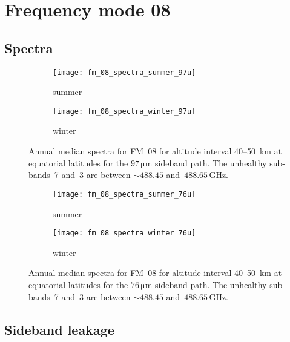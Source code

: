 \section{Frequency mode 08}
\subsection{Spectra}

\begin{figure}[ht]
    \centering
    \begin{subfigure}[b]{0.9545\textwidth}
        \texttt{[image: fm\_08\_spectra\_summer\_97u]}
        \caption{summer}\label{fig:spectra:08:summer:97u}
    \end{subfigure}
    \begin{subfigure}[b]{0.9545\textwidth}
        \texttt{[image: fm\_08\_spectra\_winter\_97u]}
        \caption{winter}\label{fig:spectra:08:winter:97u}
    \end{subfigure}
    \caption{Annual median spectra for FM~08 for altitude interval 40--50~km at
        equatorial latitudes for the $97\,\mathrm{\mu m}$ sideband path. The
        unhealthy sub-bands~7 and~3 are between $\sim488.45$
        and~$488.65\,\mathrm{GHz}$.
        }\label{fig:spectra:08:97u}
\end{figure}

\begin{figure}[ht]
    \centering
    \begin{subfigure}[b]{0.9545\textwidth}
        \texttt{[image: fm\_08\_spectra\_summer\_76u]}
        \caption{summer}\label{fig:spectra:08:summer:76u}
    \end{subfigure}
    \begin{subfigure}[b]{0.9545\textwidth}
        \texttt{[image: fm\_08\_spectra\_winter\_76u]}
        \caption{winter}\label{fig:spectra:08:winter:76u}
    \end{subfigure}
    \caption{Annual median spectra for FM~08 for altitude interval 40--50~km at
        equatorial latitudes for the $76\,\mathrm{\mu m}$ sideband path. The
        unhealthy sub-bands~7 and~3 are between $\sim488.45$
        and~$488.65\,\mathrm{GHz}$.
        }\label{fig:spectra:08:76u}
\end{figure}

\subsection{Sideband leakage}

